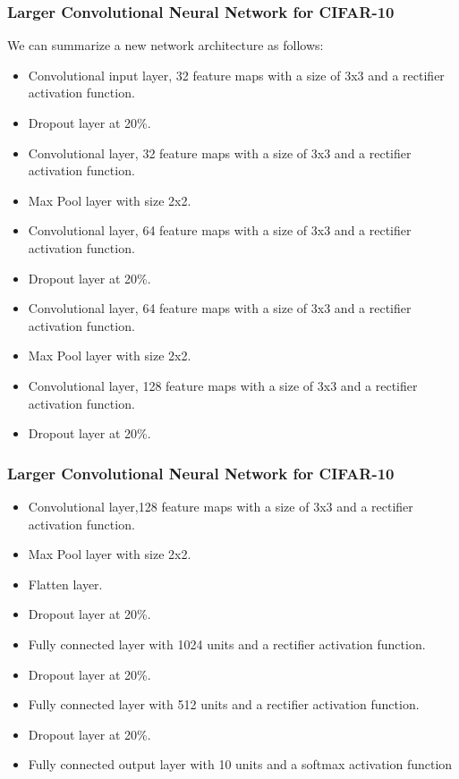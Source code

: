 \begin{frame}[fragile] \frametitle{Larger Convolutional Neural Network for CIFAR-10}
We can summarize a new network architecture as follows:
\begin{itemize}
\item Convolutional input layer, 32 feature maps with a size of 3x3 and a rectifier activation function.
\item Dropout layer at 20\%.
\item Convolutional layer, 32 feature maps with a size of 3x3 and a rectifier activation function.
\item Max Pool layer with size 2x2.
\item Convolutional layer, 64 feature maps with a size of 3x3 and a rectifier activation function.
\item Dropout layer at 20\%.
\item Convolutional layer, 64 feature maps with a size of 3x3 and a rectifier activation function.
\item Max Pool layer with size 2x2.
\item Convolutional layer, 128 feature maps with a size of 3x3 and a rectifier activation function.
\item Dropout layer at 20\%.
\end{itemize}
\end{frame}

\begin{frame}[fragile] \frametitle{Larger Convolutional Neural Network for CIFAR-10}

\begin{itemize}
\item Convolutional layer,128 feature maps with a size of 3x3 and a rectifier activation function.
\item Max Pool layer with size 2x2.
\item Flatten layer.
\item Dropout layer at 20\%.
\item Fully connected layer with 1024 units and a rectifier activation function.
\item Dropout layer at 20\%.
\item Fully connected layer with 512 units and a rectifier activation function.
\item Dropout layer at 20\%.
\item Fully connected output layer with 10 units and a softmax activation function
\end{itemize}
\end{frame}


